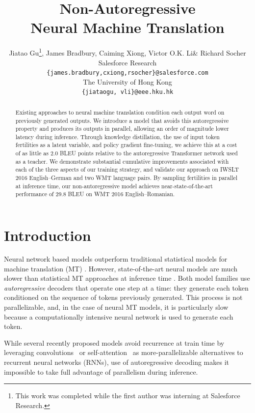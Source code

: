 \documentclass{article} %
\title{Non-Autoregressive \\Neural Machine Translation}
\author{Jiatao Gu\hku\thanks{This work was completed while the first author was interning at Salesforce Research.}, James Bradbury\mm, Caiming Xiong\mm, Victor O.K. Li\hku \& Richard Socher\mm\\
{\mm}Salesforce Research\\
\texttt{\{james.bradbury,cxiong,rsocher\}@salesforce.com} \\
{\hku}The University of Hong Kong\\
\texttt{\{jiataogu, vli\}@eee.hku.hk} 
}
\begin{document}
\def \model{NAT}

\maketitle

\begin{abstract}
Existing approaches to neural machine translation condition each output word on previously generated outputs. We introduce a model that avoids this autoregressive property and produces its outputs in parallel, allowing an order of magnitude lower latency during inference.
Through knowledge distillation, the use of input token fertilities as a latent variable, and policy gradient fine-tuning, we achieve this at a cost of as little as 2.0 BLEU points relative to the autoregressive Transformer network used as a teacher.
We demonstrate substantial cumulative improvements associated with each of the three aspects of our training strategy, and validate our approach on IWSLT 2016 English--German and two WMT language pairs. By sampling fertilities in parallel at inference time, our non-autoregressive model achieves near-state-of-the-art performance of 29.8 BLEU on WMT 2016 English--Romanian.

\end{abstract}

\section{Introduction}
Neural network based models outperform traditional statistical models for machine translation (MT) \citep{bahdanau2014neural,luong2015effective}. 
However, state-of-the-art neural models are much slower than statistical MT approaches at inference time \citep{wu2016google}.
Both model families use \emph{autoregressive} decoders that operate one step at a time: they generate each token conditioned on the sequence of tokens previously generated. This process is not parallelizable, and, in the case of neural MT models, it is particularly slow because a computationally intensive neural network is used to generate each token.

While several recently proposed models avoid recurrence at train time by leveraging convolutions~\citep{kalchbrenner2016neural, gehring2017convolutional, kaiser2017depthwise} or self-attention~\citep{vaswani2017attention} as more-parallelizable alternatives to recurrent neural networks (RNNs), use of autoregressive decoding makes it impossible to take full advantage of parallelism during inference.
\end{document}
